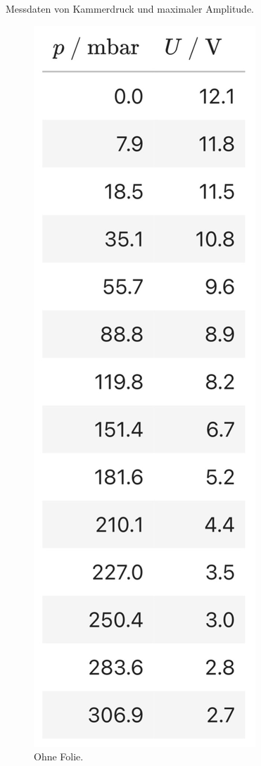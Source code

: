 \begin{table}[H]
	\centering
	\caption{Messdaten von Kammerdruck und maximaler Amplitude.}
	\label{tab:Druck}
	\hspace{9em}
	\begin{subfigure}{0.18\textwidth}
    	\centering
    	\caption{Ohne Folie.}
    	\includegraphics[width=\textwidth]{content/tabelle/OhneFolie.jpg}

\end{subfigure}
\end{table}

